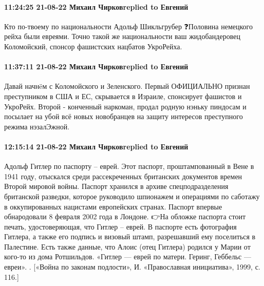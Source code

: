 \paragraph{11:24:25 21-08-22 Михаил Чирковreplied to Евгений}

Кто по-твоему по национальности Адольф Шикльгрубер ❓Половина немецкого рейха были евреями.
Точно такой же национальности ваш жидобандеровец Коломойский, спонсор фашистских нацбатов УкроРейха.

\paragraph{11:37:11 21-08-22 Михаил Чирковreplied to Евгений}

Давай начнëм с Коломойского и Зеленского.
Первый ОФИЦИАЛЬНО признан преступником в США и ЕС, скрывается в Израиле, спонсирует фашистов и УкроРейх.
Второй - конченный наркоман, продал родную нэньку пиндосам и посылает на убой всё новых новобранцев на защиту интересов преступного режима нэзалЭжной.

\paragraph{12:15:14 21-08-22 Михаил Чирковreplied to Евгений}

Адольф Гитлер по паспорту – еврей.
Этот паспорт, проштампованный в Вене в 1941 году, отыскался среди рассекреченных британских документов времен Второй мировой войны. Паспорт хранился в архиве спецподразделения британской разведки, которое руководило шпионажем и операциями по саботажу в оккупированных нацистами европейских странах. Паспорт впервые обнародовали 8 февраля 2002 года в Лондоне.
👉На обложке паспорта стоит печать, удостоверяющая, что Гитлер – еврей. В паспорте есть фотография Гитлера, а также его подпись и визовый штамп, разрешавший ему поселиться в Палестине. Есть также данные, что Алоис (отец Гитлера) родился у Марии от кого-то из дома Ротшильдов. «Гитлер — еврей по матери. Геринг, Геббельс — евреи».
. [«Война по законам подлости», И. «Православная инициатива», 1999, с. 116.]
